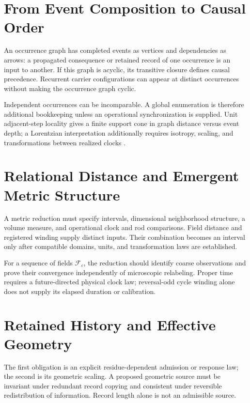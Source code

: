 \section{From Event Composition to Causal Order}\label{sec:causalorder}
An occurrence graph has completed events as vertices and dependencies as arrows: a propagated consequence or retained record of one occurrence is an input to another. If this graph is acyclic, its transitive closure defines causal precedence. Recurrent carrier configurations can appear at distinct occurrences without making the occurrence graph cyclic.

Independent occurrences can be incomparable. A global enumeration is therefore additional bookkeeping unless an operational synchronization is supplied. Unit adjacent-step locality gives a finite support cone in graph distance versus event depth; a Lorentzian interpretation additionally requires isotropy, scaling, and transformations between realized clocks \citep{arrighi2019,sorkin2003}.

\section{Relational Distance and Emergent Metric Structure}\label{sec:metric}
A metric reduction must specify intervals, dimensional neighborhood structure, a volume measure, and operational clock and rod comparisons. Field distance and registered winding supply distinct inputs. Their combination becomes an interval only after compatible domains, units, and transformation laws are established.

For a sequence of fields $\mathcal F_\varepsilon$, the reduction should identify coarse observations and prove their convergence independently of microscopic relabeling. Proper time requires a future-directed physical clock law; reversal-odd cycle winding alone does not supply its elapsed duration or calibration.

\section{Retained History and Effective Geometry}\label{sec:historygeometry}

The first obligation is an explicit residue-dependent admission or response law; the second is its geometric scaling. A proposed geometric source must be invariant under redundant record copying and consistent under reversible redistribution of information. Record length alone is not an admissible source.


